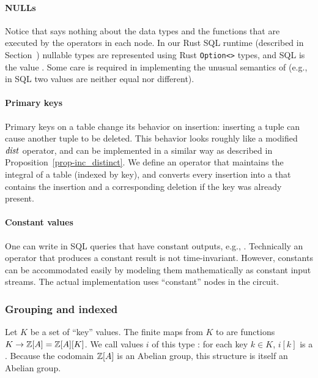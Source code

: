 \paragraph{NULLs} Notice that \dbsp says nothing about the data types
and the functions that are executed by the operators in each node.  In
our Rust SQL runtime (described in Section~)
nullable types are represented using Rust \texttt{Option<>} types, and
SQL  is the value .  Some care is required in
implementing the unusual semantics of  (e.g., in SQL two
 values are neither equal nor different).

\paragraph{Primary keys}

Primary keys on a table change its behavior on insertion: inserting a
tuple can cause another tuple to be deleted.  This behavior looks
roughly like a modified $\mathit{dist}$ operator, and can be implemented
in a similar way as described in Proposition~\ref{prop-inc_distinct}.
We define an  operator that maintains the integral of a
table (indexed by key), and converts every insertion into a \zr that
contains the insertion and a corresponding deletion if the key was
already present.

\paragraph{Constant values}

One can write in SQL queries that have constant outputs, e.g.,
.  Technically an operator that produces a constant
result is not time-invariant.  However, constants can be accommodated
easily by modeling them mathematically as constant input streams.
The actual implementation uses ``constant'' nodes in the circuit.

\subsubsection{Grouping and indexed \zrs}\label{sec:grouping}

Let $K$ be a set of ``key'' values.  The finite maps from $K$ to \zrs
are functions $K \to \mathbb{Z}[A] = \mathbb{Z}[A][K]$.  We call values $i$ of this
type : for each key $k \in K$, $i[k]$ is a \zr.
Because the codomain $\mathbb{Z}[A]$ is an Abelian group, this structure is
itself an Abelian group.

